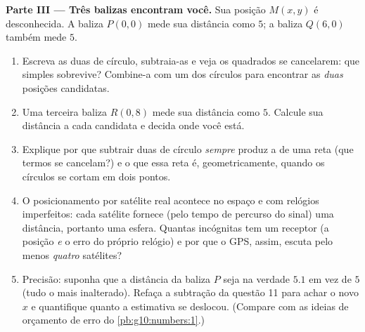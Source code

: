 \begin{problem}
\medskip
\noindent\textbf{Parte III --- Três balizas encontram você.}
Sua posição $M(x, y)$ é desconhecida. A baliza $P(0, 0)$ mede sua
distância como $5$; a baliza $Q(6, 0)$ também mede $5$.
\begin{enumerate}[resume]
  \item Escreva as duas  de círculo, subtraia-as e veja
        os quadrados se cancelarem: que  simples
        sobrevive? Combine-a com um dos círculos para encontrar
        as \emph{duas} posições candidatas.
  \item Uma terceira baliza $R(0, 8)$ mede sua distância como
        $5$. Calcule sua distância a cada candidata e decida onde
        você está.
  \item Explique por que subtrair duas  de círculo
        \emph{sempre} produz a  de uma reta (que termos se
        cancelam?) e o que essa reta é, geometricamente, quando
        os círculos se cortam em dois pontos.
  \item O posicionamento por satélite real acontece no espaço e
        com relógios imperfeitos: cada satélite fornece (pelo
        tempo de percurso do sinal) uma distância, portanto uma
        esfera. Quantas incógnitas tem um receptor (a posição
        \emph{e} o erro do próprio relógio) e por que o GPS,
        assim, escuta pelo menos \emph{quatro} satélites?
  \item Precisão: suponha que a distância da baliza $P$ seja na
        verdade $5.1$ em vez de $5$ (tudo o mais inalterado).
        Refaça a subtração da questão 11 para achar o novo $x$ e
        quantifique quanto a estimativa se deslocou. (Compare com
        as ideias de orçamento de erro do
        \cref{pb:g10:numbers:1}.)
\end{enumerate}


\end{problem}
